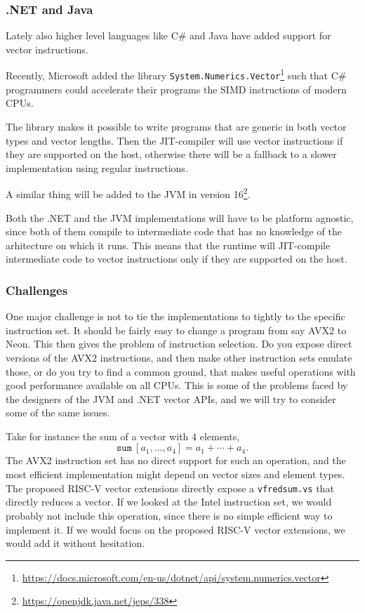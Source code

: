 \documentclass{article}
\begin{document}
\subsubsection{.NET and Java}

Lately also higher level languages like C\# and Java have added support for vector instructions.

Recently, Microsoft added the library \verb!System.Numerics.Vector!\footnote{\url{https://docs.microsoft.com/en-us/dotnet/api/system.numerics.vector}} such that C\# programmers could accelerate their programs the SIMD instructions of modern CPUs.

The library makes it possible to write programs that are generic in both vector types and vector lengths. Then the JIT-compiler will use vector instructions if they are supported on the host, otherwise there will be a fallback to a slower implementation using regular instructions.

A similar thing will be added to the JVM in version 16\footnote{\url{https://openjdk.java.net/jeps/338}}.

Both the .NET and the JVM implementations will have to be platform agnostic, since both of them compile to intermediate code that has no knowledge of the arhitecture on which it runs. This means that the runtime will JIT-compile intermediate code to vector instructions only if they are supported on the host.

\subsubsection{Challenges}

One major challenge is not to tie the implementations to tightly to the specific instruction set. It should be fairly easy to change a program from say AVX2 to Neon. This then gives the problem of instruction selection. Do you expose direct versions of the AVX2 instructions, and then make other instruction sets emulate those, or do you try to find a common ground, that makes useful operations with good performance available on all CPUs. This is some of the problems faced by the designers of the JVM and .NET vector APIs, and we will try to consider some of the same issues.

Take for instance the sum of a vector with 4 elements,
\[
    \mathtt{sum}\ [a_1, \ldots, a_4] = a_1 + \cdots + a_4.
\]
The AVX2 instruction set has no direct support for such an operation, and the most efficient implementation might depend on vector sizes and element types. The proposed RISC-V vector extensions directly expose a \texttt{vfredsum.vs} that directly reduces a vector. If we looked at the Intel instruction set, we would probably not include this operation, since there is no simple efficient way to implement it. If we would focus on the proposed RISC-V vector extensions, we would add it without hesitation.
\end{document}
